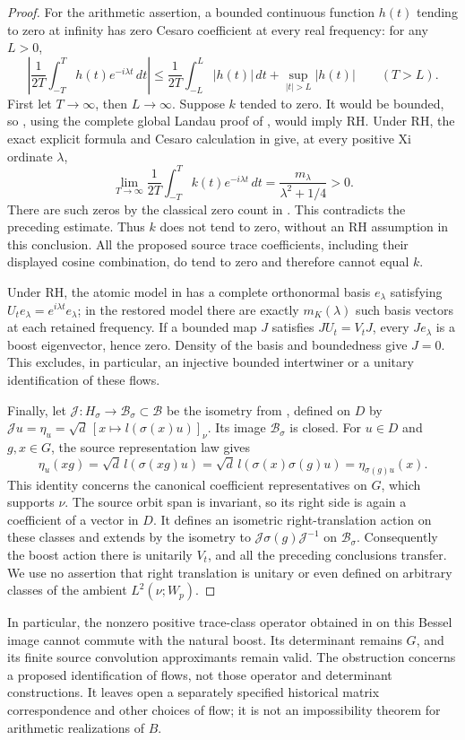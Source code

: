 \begin{proof}
For the arithmetic assertion, a bounded continuous function
\(h(t)\) tending to zero at infinity has zero Cesaro coefficient
at every real frequency: for any \(L>0\),
\[
 \left|\frac1{2T}\int_{-T}^{T}h(t)e^{-i\lambda t}\,dt\right|
 \le\frac{1}{2T}\int_{-L}^{L}|h(t)|\,dt
      +\sup_{|t|>L}|h(t)|\qquad(T>L).
\]
First let \(T\to\infty\), then \(L\to\infty\).
Suppose \(k\) tended to zero. It would be bounded, so
, using the complete global Landau proof of
, would imply RH. Under RH, the exact explicit
formula and Cesaro calculation in  give, at every
positive Xi ordinate \(\lambda\),
\[
 \lim_{T\to\infty}\frac1{2T}
       \int_{-T}^{T}k(t)e^{-i\lambda t}\,dt
 =\frac{m_\lambda}{\lambda^2+1/4}>0.
\]
There are such zeros by the classical zero count in .
This contradicts the preceding estimate. Thus \(k\) does not
tend to zero, without an RH assumption in this conclusion.
All the proposed source trace coefficients, including their
displayed cosine combination, do tend to zero and therefore
cannot equal \(k\).

Under RH, the atomic model in  has a complete
orthonormal basis \(e_\lambda\) satisfying
\(U_te_\lambda=e^{i\lambda t}e_\lambda\); in the restored
model there are exactly \(m_K(\lambda)\) such basis vectors
at each retained frequency. If a bounded map \(J\) satisfies
\(JU_t=V_tJ\), every \(Je_\lambda\) is a boost eigenvector,
hence zero. Density of the basis and boundedness give \(J=0\).
This excludes, in particular, an injective bounded intertwiner
or a unitary identification of these flows.

Finally, let
\(\mathcal J:H_\sigma\longrightarrow\mathcal B_\sigma
\subset\mathcal B\)
be the isometry from , defined on \(D\) by
\(\mathcal Ju=\eta_u=\sqrt d\,[x\mapsto l(\sigma(x)u)]_\nu\).
Its image \(\mathcal B_\sigma\) is closed. For \(u\in D\)
and \(g,x\in G\), the source representation law gives
\[
 \eta_u(xg)=\sqrt d\,l(\sigma(xg)u)
          =\sqrt d\,l(\sigma(x)\sigma(g)u)
          =\eta_{\sigma(g)u}(x).
\]
This identity concerns the canonical coefficient representatives
on \(G\), which supports \(\nu\). The source orbit span is
invariant, so its right side is again a coefficient of a vector
in \(D\). It defines an isometric right-translation action on
these classes and extends by the isometry to
\(\mathcal J\sigma(g)\mathcal J^{-1}\) on
\(\mathcal B_\sigma\).
Consequently the boost action there is unitarily \(V_t\), and
all the preceding conclusions transfer. We use no assertion
that right translation is unitary or even defined on arbitrary
classes of the ambient \(L^2(\nu;W_p)\).
\end{proof}

In particular, the nonzero positive trace-class operator obtained
in  on this Bessel image cannot commute with the
natural boost. Its determinant remains \(G\), and its finite
source convolution approximants remain valid. The obstruction
concerns a proposed identification of flows, not those operator
and determinant constructions. It leaves open a separately
specified historical matrix correspondence and other choices of
flow; it is not an impossibility theorem for arithmetic
realizations of \(B\).
